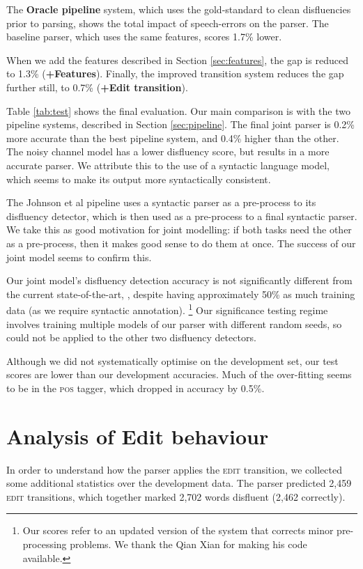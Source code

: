 \documentclass[11pt,letterpaper]{article}
\newcommand{\edittrans}{\textsc{edit}\xspace}
\begin{document}
The \textbf{Oracle pipeline} system, which uses the gold-standard to clean disfluencies
prior to parsing, shows the total impact of speech-errors on the parser.  The
baseline parser, which uses the same features, scores 1.7\% lower.

When we add the features described in Section \ref{sec:features}, the gap is reduced
to 1.3\% (\textbf{+Features}).  Finally, the improved transition system reduces
the gap further still, to 0.7\% (\textbf{+Edit transition}).

Table \ref{tab:test} shows the final evaluation.  
Our main comparison is with the two pipeline systems, described in Section
\ref{sec:pipeline}. 
The final joint parser is 0.2\% more accurate than the best pipeline system, and
0.4\% higher than the other.
The \citet{Johnson04a} noisy channel model has a lower
disfluency score, but results in a more accurate parser. We attribute this to
the use of a syntactic language model, which seems to make its output more syntactically
consistent.

The Johnson et al pipeline uses a syntactic parser as a pre-process to its
disfluency detector, which is then used as a pre-process to a final syntactic
parser.  We take this as good motivation for joint modelling: if both tasks need
the other as a pre-process, then it makes good sense to do them at once.  The
success of our joint model seems to confirm this.

Our joint model's disfluency detection accuracy is not significantly different from
the current state-of-the-art, \citet{qian:13}, despite having approximately 50\%
as much training data (as we require syntactic annotation).
\footnote{Our scores refer to an updated version of the system
that corrects minor pre-processing problems. We thank the Qian Xian for making
his code available.}
Our significance testing regime involves training multiple
models of our parser with different random seeds, so could not be applied to
the other two disfluency detectors.

Although we did not systematically
optimise on the development set, our test scores are lower than our development
accuracies. Much of the over-fitting seems to be in the \textsc{pos} tagger,
which dropped in accuracy by 0.5\%.

\section{Analysis of Edit behaviour}

In order to understand how the parser applies the \edittrans transition, we
collected some additional statistics over the development data.
The parser predicted 2,459 \edittrans transitions,
which together marked 2,702
words disfluent (2,462 correctly).
\end{document}
